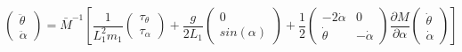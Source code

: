 \begin{equation}
\left( \begin{matrix}
        \ddot \theta \\
        \ddot \alpha
    \end{matrix} \right) = \bar M^{-1} \left[
\frac{1}{ L_1^2 m_1}
    \left( \begin{matrix}
        \tau_{\theta} \\
        \tau_{\alpha}
    \end{matrix} \right)
    +\frac{g}{2L_1}
    \left( \begin{matrix}
        0 \\
        sin( \alpha)
    \end{matrix} \right)
     + \frac{1}{2} \left( \begin{matrix}
    - 2 \dot \alpha & 0\\
        \dot \theta & -\dot \alpha
    \end{matrix} \right)
    \frac{\partial M}{\partial \alpha}
     \left( \begin{matrix}
        \dot \theta \\
        \dot \alpha
    \end{matrix} \right) \right]
\end{equation}


